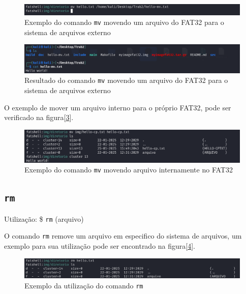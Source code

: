 \documentclass[
    12pt,				%
    oneside,   	        %
    a4paper,			%
    english,			%
    french,				%
    spanish,			%
    brazil,				%
    ]{pacotes/abntex2}
\begin{document}
\begin{figure}[H]
    \centering
    \includegraphics[width=450pt]{figuras/resultados/13-mv-interno-externo.PNG}
    \caption{Exemplo do comando \texttt{mv} movendo um arquivo do FAT32 para o sistema de arquivos externo}
    \label{fig:mv-interno-externo}
\end{figure}

\begin{figure}[H]
    \centering
    \includegraphics[width=450pt]{figuras/resultados/14-mv-externo-validacao.PNG}
    \caption{Resultado do comando \texttt{mv} movendo um arquivo do FAT32 para o sistema de arquivos externo}
    \label{fig:mv-externo-validacao}
\end{figure}

O exemplo de mover um arquivo interno para o próprio FAT32, pode ser verificado na figura[\ref{fig:mv-interno}].

\begin{figure}[H]
    \centering
    \includegraphics[width=450pt]{figuras/resultados/18-mv-interno-interno.PNG}
    \caption{Exemplo do comando \texttt{mv} movendo arquivo internamente no FAT32}
    \label{fig:mv-interno}
\end{figure}


\subsection{\texttt{rm}}
\label{subsec:rm}
Utilização: \$ \texttt{rm} (arquivo)

O comando \texttt{rm} remove um arquivo em especifico do sistema de arquivos, um exemplo para sua utilização pode ser encontrado na figura[\ref{fig:rm}].

\begin{figure}[H]
    \centering
    \includegraphics[width=450pt]{figuras/resultados/16-rm.PNG}
    \caption{Exemplo da utilização do comando \texttt{rm}}
    \label{fig:rm}
\end{figure}
\end{document}
